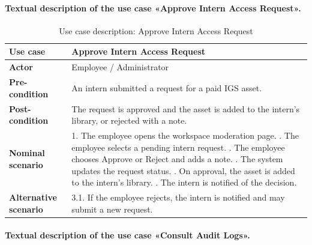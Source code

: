 \paragraph{Textual description of the use case «Approve Intern Access Request».}

\begin{table}[H]
\centering
\caption{Use case description: Approve Intern Access Request}
\label{tab:uc_intern}
\renewcommand{\arraystretch}{1.3}
\begin{tabularx}{\textwidth}{|L{3.2cm}|X|}
\hline
\textbf{Use case} & Approve Intern Access Request \\
\hline
\textbf{Actor} & Employee / Administrator \\
\hline
\textbf{Pre-condition} & An intern submitted a request for a paid IGS asset. \\
\hline
\textbf{Post-condition} & The request is approved and the asset is added to the intern's library, or rejected with a note. \\
\hline
\textbf{Nominal scenario} &
1. The employee opens the workspace moderation page. . The employee selects a pending intern request. . The employee chooses Approve or Reject and adds a note. . The system updates the request status. . On approval, the asset is added to the intern's library. . The intern is notified of the decision. \\
\hline
\textbf{Alternative scenario} &
3.1. If the employee rejects, the intern is notified and may submit a new request. \\
\hline
\end{tabularx}
\end{table}

\paragraph{Textual description of the use case «Consult Audit Logs».}

